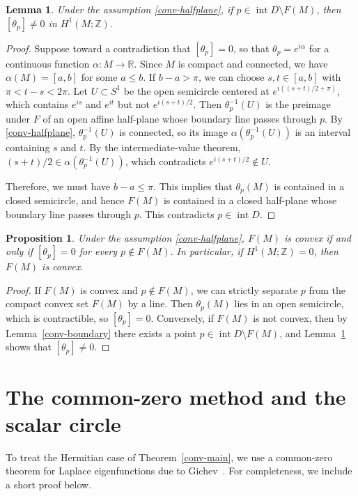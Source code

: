 \documentclass[11pt,reqno]{amsart}
\newtheorem{proposition}[theorem]{Proposition}
\newtheorem{lemma}[theorem]{Lemma}
\theoremstyle{remark}
\newcommand{\R}{\mathbb R}
\newcommand{\Z}{\mathbb Z}
\begin{document}
\begin{lemma}\label{conv-angular}
Under the assumption \eqref{conv-halfplane}, if
$p\in\operatorname{int}D\setminus F(M)$, then $[\theta_p]\ne0$ in
$H^1(M;\Z)$.
\end{lemma}
\begin{proof}
Suppose toward a contradiction that $[\theta_p]=0$, so that
$\theta_p=e^{i\alpha}$ for a continuous function $\alpha:M\to\R$. Since
$M$ is compact and connected, we have $\alpha(M)=[a,b]$ for some
$a\le b$. If $b-a>\pi$, we can choose $s,t\in[a,b]$ with
$\pi<t-s<2\pi$. Let $U\subset S^1$ be the open semicircle centered at
$e^{i((s+t)/2+\pi)}$, which contains $e^{is}$ and $e^{it}$ but not
$e^{i(s+t)/2}$. Then $\theta_p^{-1}(U)$ is the preimage under $F$ of an
open affine half-plane whose boundary line passes through $p$. By
\eqref{conv-halfplane}, $\theta_p^{-1}(U)$ is connected, so its image
$\alpha(\theta_p^{-1}(U))$ is an interval containing $s$ and $t$. By the
intermediate-value theorem, $(s+t)/2\in\alpha(\theta_p^{-1}(U))$, which
contradicts $e^{i(s+t)/2}\notin U$.

Therefore, we must have $b-a\le\pi$. This implies that $\theta_p(M)$ is
contained in a closed semicircle, and hence $F(M)$ is contained in a
closed half-plane whose boundary line passes through $p$. This
contradicts $p\in\operatorname{int}D$.
\end{proof}

\begin{proposition}\label{conv-topological}
Under the assumption \eqref{conv-halfplane}, $F(M)$ is convex if and
only if $[\theta_p]=0$ for every $p\notin F(M)$. In particular, if
$H^1(M;\Z)=0$, then $F(M)$ is convex.
\end{proposition}
\begin{proof}
If $F(M)$ is convex and $p\notin F(M)$, we can strictly separate $p$
from the compact convex set $F(M)$ by a line. Then $\theta_p(M)$ lies in
an open semicircle, which is contractible, so $[\theta_p]=0$.
Conversely, if $F(M)$ is not convex, then by Lemma~\ref{conv-boundary}
there exists a point $p\in\operatorname{int}D\setminus F(M)$, and
Lemma~\ref{conv-angular} shows that $[\theta_p]\ne0$.
\end{proof}

\section{The common-zero method and the scalar circle}\label{sec:zero}

To treat the Hermitian case of Theorem~\ref{conv-main}, we use a
common-zero theorem for Laplace eigenfunctions due to
Gichev~\cite[Theorem~1 and Corollary~2, pages~202--204]{Gichev2004}. For
completeness, we include a short proof below.
\end{document}
